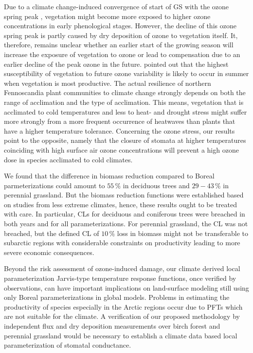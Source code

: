 \documentclass[bg, manuscript]{copernicus}
\begin{document}
Due to a climate change-induced convergence of start of GS with the ozone spring peak \citep{EP:Karlsson2007}, vegetation might become more exposed to higher ozone concentrations in early phenological stages. However, the decline of this ozone spring peak is partly caused by dry deposition of ozone to vegetation itself. It, therefore, remains unclear whether an earlier start of the growing season will increase the exposure of vegetation to ozone or lead to compensation due to an earlier decline of the peak ozone in the future. \citet{ESPR:Hayes2021} pointed out that the highest susceptibility of vegetation to future ozone variability is likely to occur in summer when vegetation is most productive. The actual resilience of northern Fennoscandia plant communities to climate change strongly depends on both the range of acclimation and the type of acclimation. This means, vegetation that is acclimated to cold temperatures and less to heat- and drought stress might suffer more strongly from a more frequent occurrence of heatwaves than plants that have a higher temperature tolerance. Concerning the ozone stress, our results point to the opposite, namely that the closure of stomata at higher temperatures coinciding with high surface air ozone concentrations will prevent a high ozone dose in species acclimated to cold climates.

We found that the difference in biomass reduction compared to Boreal parmeterizations \citep{ICP:MappingManual2017} could amount to $55\,\unit{\%}$ in deciduous trees and $29-43\,\unit{\%}$ in perennial grassland. But the biomass reduction functions were established based on studies from less extreme climates, hence, these results ought to be treated with care. In particular, CLs for deciduous and coniferous trees were breached in both years and for all parameterizations. For perennial grassland, the CL was not breached, but the defined CL of $10\,\unit{\%}$ loss in biomass might not be transferable to subarctic regions with considerable constraints on productivity leading to more severe economic consequences.

Beyond the risk assessment of ozone-induced damage, our climate derived local parameterization Jarvis-type temperature response functions, once verified by observations, can have important implications on land-surface modeling still using only Boreal parameterizations in global models. Problems in estimating the productivity of species especially in the Arctic regions occur due to PFTs which are not suitable for the climate. A verification of our proposed methodology by independent flux and dry deposition measurements over birch forest and perennial grassland would be necessary to establish a climate data based local parameterization of stomatal conductance.
\end{document}
